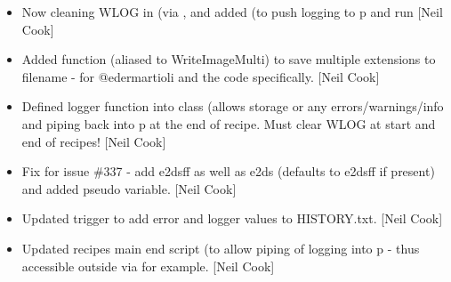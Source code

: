 \documentclass[a4paper,10pt,english]{report}
\begin{document}
\begin{itemize}
\item {} 
Now cleaning WLOG in  (via , and added
 (to push logging to p and run  {[}Neil Cook{]}

\item {} 
Added function  (aliased to WriteImageMulti) to save
multiple extensions to filename - for @edermartioli and the 
code specifically. {[}Neil Cook{]}

\item {} 
Defined logger function into class (allows storage or any
errors/warnings/info and piping back into p at the end of recipe. Must
clear WLOG at start and end of recipes! {[}Neil Cook{]}

\item {} 
Fix for issue \#337 - add e2dsff as well as e2ds (defaults to e2dsff if
present) and added  pseudo variable. {[}Neil Cook{]}

\item {} 
Updated trigger to add error and logger values to HISTORY.txt. {[}Neil
Cook{]}

\item {} 
Updated recipes main end script (to allow piping of logging into p -
thus accessible outside via  for example.
{[}Neil Cook{]}

\end{itemize}
\end{document}
